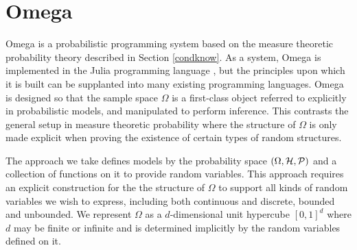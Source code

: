 

%

\section{Omega}
Omega is a probabilistic programming system based on the measure theoretic probability theory described in Section \ref{condknow}.
As a system, Omega is implemented in the Julia programming language \citep{bezanson2017julia}, but the principles upon which it is built can be supplanted into many existing programming languages.
Omega is designed so that the sample space $\Omega$ is a first-class object referred to explicitly in probabilistic models, and manipulated to perform inference. 
This contrasts the general setup in
measure theoretic probability where the structure
of $\Omega$ is only made explicit when proving the
existence of certain types of random structures.

The approach we take defines models by the probability 
space $(\Omega, {\cal H}, {\cal P})$ and a collection
of functions on it to provide random variables. 
This approach requires an explicit construction for the
the structure of $\Omega$ to support all kinds
of random variables we wish to express, including both continuous and discrete, bounded and unbounded.
We represent $\Omega$ as a $d$-dimensional unit hypercube $[0, 1]^d$ where $d$ may be finite or infinite and is determined implicitly by the random variables defined on it.

